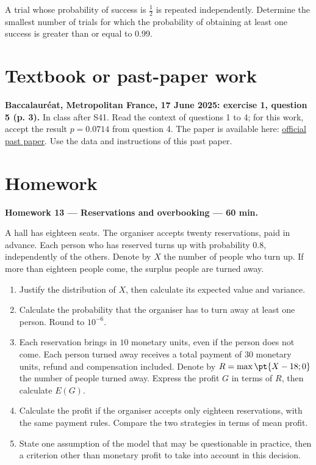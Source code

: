 A trial whose probability of success is $\frac12$ is repeated independently. Determine the smallest number of trials for which the probability of obtaining at least one success is greater than or equal to $\num{0,99}$.

\section{Textbook or past-paper work}\textbf{Baccalauréat, Metropolitan France, 17 June 2025: exercise 1, question 5 (p. 3).} In class after S41. Read the context of questions 1 to 4; for this work, accept the result $p=\num{0,0714}$ from question 4. The paper is available here: \href{https://www.education.gouv.fr/sites/default/files/2025-06/baccalaur-at-g-n-ral-2025-math-matiques-440856.pdf}{official past paper}. Use the data and instructions of this past paper.

\mxnewpage
\section{Homework}\textbf{Homework 13 --- Reservations and overbooking --- 60 min.}\par A hall has eighteen seats. The organiser accepts twenty reservations, paid in advance. Each person who has reserved turns up with probability $\num{0,8}$, independently of the others. Denote by $X$ the number of people who turn up. If more than eighteen people come, the surplus people are turned away.
\begin{enumerate}\item Justify the distribution of $X$, then calculate its expected value and variance.
\item Calculate the probability that the organiser has to turn away at least one person. Round to $10^{-6}$.
\item Each reservation brings in $10$ monetary units, even if the person does not come. Each person turned away receives a total payment of $30$ monetary units, refund and compensation included. Denote by $R=\max\pt{X-18;0}$ the number of people turned away. Express the profit $G$ in terms of $R$, then calculate $E(G)$.
\item Calculate the profit if the organiser accepts only eighteen reservations, with the same payment rules. Compare the two strategies in terms of mean profit.
\item State one assumption of the model that may be questionable in practice, then a criterion other than monetary profit to take into account in this decision.\end{enumerate}

